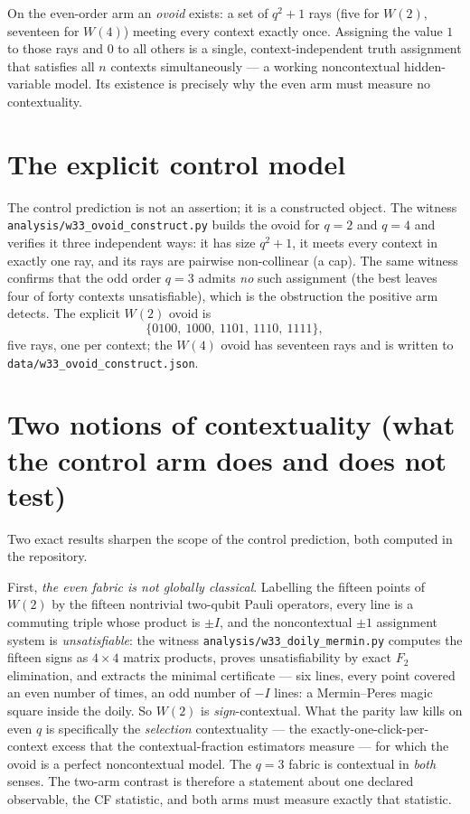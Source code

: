 \documentclass[11pt]{article}
\begin{document}
On the even-order arm an \emph{ovoid} exists: a set of $q^2+1$ rays (five for $W(2)$, seventeen for
$W(4)$) meeting every context exactly once.  Assigning the value $1$ to those rays and $0$ to all others
is a single, context-independent truth assignment that satisfies all $n$ contexts simultaneously --- a
working noncontextual hidden-variable model.  Its existence is precisely why the even arm must measure
no contextuality.

\section{The explicit control model}
The control prediction is not an assertion; it is a constructed object.  The witness
\texttt{analysis/w33\_ovoid\_construct.py} builds the ovoid for $q=2$ and $q=4$ and verifies it three
independent ways: it has size $q^2+1$, it meets every context in exactly one ray, and its rays are
pairwise non-collinear (a cap).  The same witness confirms that the odd order $q=3$ admits \emph{no}
such assignment (the best leaves four of forty contexts unsatisfiable), which is the obstruction the
positive arm detects.  The explicit $W(2)$ ovoid is
\[
  \{0100,\ 1000,\ 1101,\ 1110,\ 1111\},
\]
five rays, one per context; the $W(4)$ ovoid has seventeen rays and is written to
\texttt{data/w33\_ovoid\_construct.json}.

\section{Two notions of contextuality (what the control arm does and does not test)}
Two exact results sharpen the scope of the control prediction, both computed in the repository.

First, \emph{the even fabric is not globally classical}.  Labelling the fifteen points of $W(2)$ by the
fifteen nontrivial two-qubit Pauli operators, every line is a commuting triple whose product is $\pm I$,
and the noncontextual $\pm1$ assignment system is \emph{unsatisfiable}: the witness
\texttt{analysis/w33\_doily\_mermin.py} computes the fifteen signs as $4\times4$ matrix products, proves
unsatisfiability by exact $F_2$ elimination, and extracts the minimal certificate --- six lines, every
point covered an even number of times, an odd number of $-I$ lines: a Mermin--Peres magic square inside
the doily.  So $W(2)$ is \emph{sign}-contextual.  What the parity law kills on even $q$ is specifically
the \emph{selection} contextuality --- the exactly-one-click-per-context excess that the
contextual-fraction estimators measure --- for which the ovoid is a perfect noncontextual model.  The
$q=3$ fabric is contextual in \emph{both} senses.  The two-arm contrast is therefore a statement about
one declared observable, the CF statistic, and both arms must measure exactly that statistic.
\end{document}
